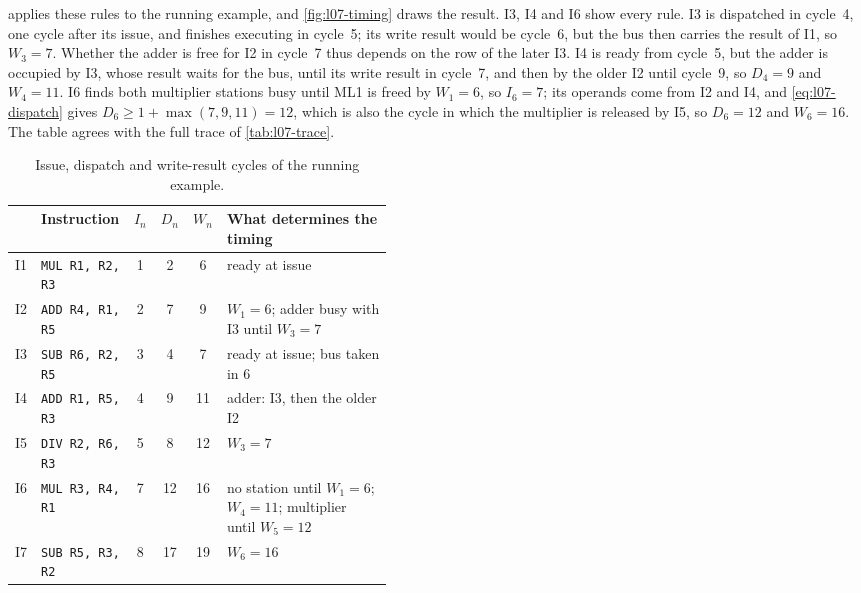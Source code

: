 \documentclass[../main.tex]{subfiles}
\begin{document}
\begin{example}
  \label{ex:l07-timing}
   applies these rules to the running example, and
  \cref{fig:l07-timing} draws the result.  I3, I4 and I6 show every rule.
  I3 is dispatched in cycle~4, one cycle after its issue, and finishes
  executing in cycle~5; its write result would be cycle~6, but the bus then
  carries the result of I1, so $W_3 = 7$.  Whether the adder is free for I2 in
  cycle~7 thus depends on the row of the later I3.  I4 is ready from cycle~5,
  but the adder is occupied by I3, whose result waits for the bus, until its
  write result in cycle~7, and then by the older I2 until cycle~9, so
  $D_4 = 9$ and $W_4 = 11$.  I6 finds both multiplier
  stations busy until ML1 is freed by $W_1 = 6$, so $I_6 = 7$; its operands
  come from I2 and I4, and \cref{eq:l07-dispatch} gives
  $D_6 \ge 1 + \max(7, 9, 11) = 12$, which is also the cycle in which the
  multiplier is released by I5, so $D_6 = 12$ and $W_6 = 16$.  The table
  agrees with the full trace of \cref{tab:l07-trace}.
\end{example}

\begin{table}[htbp]
  \centering\small
  \caption{Issue, dispatch and write-result cycles of the running example.}
  \label{tab:l07-timing}
  \begin{tabular}{@{}llccc>{\raggedright\arraybackslash}p{0.44\linewidth}@{}}
    \toprule
    & Instruction & $I_n$ & $D_n$ & $W_n$ & What determines the timing \\
    \midrule
    I1 & \texttt{MUL R1, R2, R3} & 1 & 2  & 6  & ready at issue \\
    I2 & \texttt{ADD R4, R1, R5} & 2 & 7  & 9  & $W_1 = 6$; adder busy with I3 until $W_3 = 7$ \\
    I3 & \texttt{SUB R6, R2, R5} & 3 & 4  & 7  & ready at issue; bus taken in 6 \\
    I4 & \texttt{ADD R1, R5, R3} & 4 & 9  & 11 & adder: I3, then the older I2 \\
    I5 & \texttt{DIV R2, R6, R3} & 5 & 8  & 12 & $W_3 = 7$ \\
    I6 & \texttt{MUL R3, R4, R1} & 7 & 12 & 16 & no station until $W_1 = 6$;
                                               $W_4 = 11$; multiplier until $W_5 = 12$ \\
    I7 & \texttt{SUB R5, R3, R2} & 8 & 17 & 19 & $W_6 = 16$ \\
    \bottomrule
  \end{tabular}
\end{table}
\end{document}
